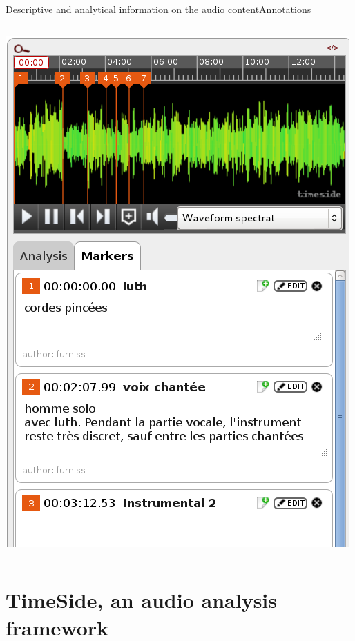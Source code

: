 \documentclass[final, hyperref, table]{beamer}
\begin{document}
\begin{frame}{Descriptive and analytical information on the audio content}{Annotations}
\begin{columns}[T]
    \begin{column}{0.4\textwidth}
      \includegraphics[width=\linewidth]{../img/markers.png}
    \end{column}
  \end{columns}
\end{frame}

\section[TimeSide]{TimeSide, an audio analysis framework}\label{sec:TimeSide}
\end{document}

